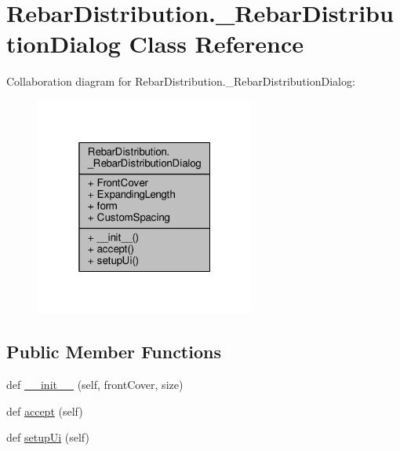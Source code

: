 \hypertarget{classRebarDistribution_1_1__RebarDistributionDialog}{}\section{Rebar\+Distribution.\+\_\+\+Rebar\+Distribution\+Dialog Class Reference}
\label{classRebarDistribution_1_1__RebarDistributionDialog}


Collaboration diagram for Rebar\+Distribution.\+\_\+\+Rebar\+Distribution\+Dialog\+:\nopagebreak
\begin{figure}[H]
\begin{center}
\leavevmode
\includegraphics[width=205pt]{classRebarDistribution_1_1__RebarDistributionDialog__coll__graph}
\end{center}
\end{figure}
\subsection*{Public Member Functions}
\begin{DoxyCompactItemize}
\item 
def \hyperlink{classRebarDistribution_1_1__RebarDistributionDialog_aa490091ba4b48aed1a1815e15fd60241}{\+\_\+\+\_\+init\+\_\+\+\_\+} (self, front\+Cover, size)
\item 
def \hyperlink{classRebarDistribution_1_1__RebarDistributionDialog_a518692f4a12113a2bcdfeaa0676f87be}{accept} (self)
\item 
def \hyperlink{classRebarDistribution_1_1__RebarDistributionDialog_aa96660ccded2b2b91a36a8099199842d}{setup\+Ui} (self)
\end{DoxyCompactItemize}
